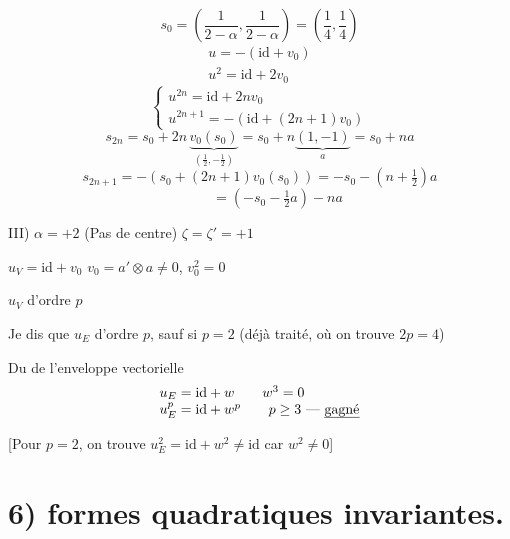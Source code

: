 \documentclass[11pt,a4paper]{article}
\begin{document}
\[
s_0 = \left(\frac{1}{2-\alpha}, \frac{1}{2-\alpha}\right) = \left(\frac{1}{4}, \frac{1}{4}\right)
\]
\[
\begin{array}{l}
u = -(\mathrm{id} + v_0) \\
u^2 = \mathrm{id} + 2 v_0
\end{array}
\]
\[
\begin{cases}
u^{2n} = \mathrm{id} + 2n v_0 \\
u^{2n+1} = -(\mathrm{id} + (2n+1) v_0)
\end{cases}
\]
\[
s_{2n} = s_0 + 2n\, \underbrace{v_0(s_0)}_{(\frac12, -\frac12)} = s_0 + n \underbrace{(1,-1)}_{a} = s_0 + na
\]
\[
s_{2n+1} = -(s_0 + (2n+1) v_0(s_0)) = -s_0 - \left(n + \tfrac12\right) a
\]
\[
\phantom{s_{2n+1}} = \left(-s_0 - \tfrac12 a\right) - na
\]

III) $\alpha = +2$ (Pas de centre) \qquad $\zeta = \zeta' = +1$

\struck{\ill{}} $u_V = \mathrm{id} + v_0$ \qquad $v_0 = a' \otimes a \neq 0$, $v_0^2 = 0$

$u_V$ d'ordre $p$

Je dis que $u_E$ d'ordre $p$, sauf si $p = 2$ (déjà traité, où on trouve $2p = 4$)

 Du  de l'enveloppe vectorielle
\[
\begin{array}{l}
u_E = \mathrm{id} + w \qquad w^3 = 0 \\
u_E^p = \mathrm{id} + w^p \qquad p \geq 3 \text{ --- \uncertain{gagné}}
\end{array}
\]

[Pour $p = 2$, on trouve $u_E^2 = \mathrm{id} + w^2 \neq \mathrm{id}$ car $w^2 \neq 0$]

\section*{6) formes quadratiques invariantes.}
\end{document}
